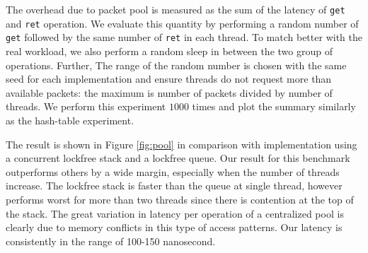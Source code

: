 The overhead due to packet pool is measured as the sum of the latency of
\texttt{get} and \texttt{ret} operation. We evaluate this quantity by
performing a random number of \texttt{get} followed by the same number of
\texttt{ret} in each thread. To match better with the real workload, we also
perform a random sleep in between the two group of operations. Further, The
range of the random number is chosen with the same seed for each implementation
and ensure threads do not request more than available packets: the maximum is
number of packets divided by number of threads. We perform this experiment
$1000$ times and plot the summary similarly as  the hash-table experiment.

The result is shown in Figure \ref{fig:pool} in comparison with implementation
using a concurrent lockfree stack and a lockfree queue. Our result for this
benchmark outperforms others by a wide margin, especially when the number of
threads increase. The lockfree stack is faster than the queue at single thread,
however performs worst for more than two threads since there is contention at
the top of the stack. The great variation in latency per operation of a
centralized pool is clearly due to memory conflicts in this type of access
patterns. Our latency is consistently in the range of 100-150 nanosecond.


